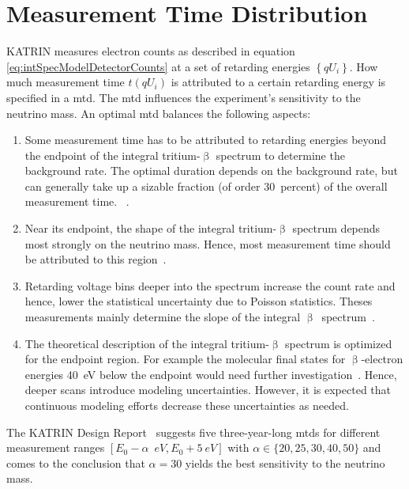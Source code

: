 \section{Measurement Time Distribution}
\label{sec:intSpecModelMTD}
KATRIN measures electron counts as described in equation \eqref{eq:intSpecModelDetectorCounts} at a set of retarding energies $\left\{qU_i\right\}$. How much measurement time $t(qU_i)$ is attributed to a certain retarding energy is specified in a \gls{mtd}. The \gls{mtd} influences the experiment's sensitivity to the neutrino mass. An optimal \gls{mtd} balances the following aspects:
\begin{enumerate}
	\item Some measurement time has to be attributed to retarding energies beyond the endpoint of the integral tritium-$\upbeta$ spectrum to determine the background rate. The optimal duration depends on the background rate, but can generally take up a sizable fraction (of order \SI{30}{percent}) of the overall measurement time. ~\cite{Angrik:2005ep, Kleesiek2014}.
	\item Near its endpoint, the shape of the integral tritium-$\upbeta$ spectrum depends most strongly on the neutrino mass. Hence, most measurement time should be attributed to this region~\cite{Angrik:2005ep, Kleesiek2014}.
	\item Retarding voltage bins deeper into the spectrum increase the count rate and hence, lower the statistical uncertainty due to Poisson statistics. Theses measurements mainly determine the slope of the integral $\upbeta$~spectrum~\cite{Angrik:2005ep, Kleesiek2014}.
	\item The theoretical description of the integral tritium-$\upbeta$ spectrum is optimized for the endpoint region. For example the molecular final states for $\upbeta$-electron energies \SI{40}{eV} below the endpoint would need further investigation~\cite{Doss:2006}. Hence, deeper scans introduce modeling uncertainties. However, it is expected that continuous modeling efforts decrease these uncertainties as needed.
\end{enumerate}
The KATRIN Design Report~\cite{Angrik:2005ep} suggests five \mbox{three-year-long} \gls{mtd}s for different measurement ranges $[E_0-\alpha\;\SI{}{eV}, E_0 + \SI{5}{eV}]$ with $\alpha \in \{20, 25, 30, 40, 50\}$ and comes to the conclusion that $\alpha=30$ yields the best sensitivity to the neutrino mass.


